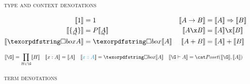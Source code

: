 \begin{figure*}
  \textsc{type and context denotations}

  \begin{align*}
    \den{\tunit} &= \termO & \den{A \to B} &= \expO{\den{A}}{\den{B}}
    \\
    \den{\tseteq A} &= \pfinof{\den{\eqt A}}
    & \den{A \x B} &= \den{A} \x \den{B}
    \\
    \den{\iso A} &= \iso{\den{A}} & \den{A + B} &= \den{A} + \den{B}
  \end{align*}


  \begin{align*}
    \den{\G} &= \prod_{H \in \G} \den{H} &
    \den{\h x A} &= \den{A} & \den{\hd x A} &= \iso{\den{A}} &
    \den{\G \vdash A} &= \Poset(\den\G, \den A)
  \end{align*}

  \textsc{term denotations}


\end{figure*}
